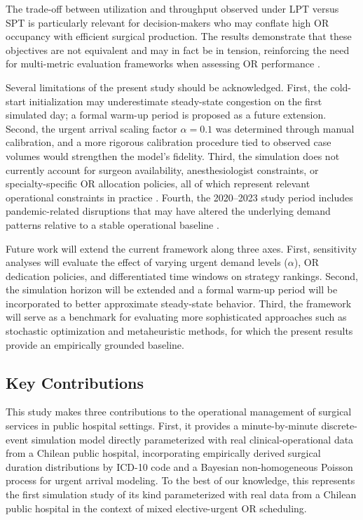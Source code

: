 \documentclass[sn-mathphys-num]{sn-jnl}
\begin{document}
The trade-off between utilization and throughput observed under LPT
versus SPT is particularly relevant for decision-makers who may
conflate high OR occupancy with efficient surgical production. The
results demonstrate that these objectives are not equivalent and may
in fact be in tension, reinforcing the need for multi-metric
evaluation frameworks when assessing OR performance \cite{schouten2023}.

Several limitations of the present study should be acknowledged.
First, the cold-start initialization may underestimate steady-state
congestion on the first simulated day; a formal warm-up period is
proposed as a future extension. Second, the urgent
arrival scaling factor $\alpha = 0.1$ was determined through manual
calibration, and a more rigorous calibration procedure tied to
observed case volumes would strengthen the model's fidelity. Third,
the simulation does not currently account for surgeon availability,
anesthesiologist constraints, or specialty-specific OR allocation
policies, all of which represent relevant operational constraints in
practice \cite{tsang2025}. Fourth, the 2020--2023 study period
includes pandemic-related disruptions that may have altered the
underlying demand patterns relative to a stable operational baseline \cite{campos2024examining}.

Future work will extend the current framework along three axes.
First, sensitivity analyses will evaluate the effect of varying
urgent demand levels ($\alpha$), OR dedication policies, and
differentiated time windows on strategy rankings. Second, the
simulation horizon will be extended and a formal warm-up period
will be incorporated to better approximate steady-state behavior.
Third, the framework will serve as a benchmark for evaluating more
sophisticated approaches such as stochastic optimization and
metaheuristic methods, for which the present results provide an
empirically grounded baseline.

\subsection{Key Contributions}

This study makes three contributions to the operational management
of surgical services in public hospital settings. First, it
provides a minute-by-minute discrete-event simulation model directly
parameterized with real clinical-operational data from a Chilean
public hospital, incorporating empirically derived surgical duration
distributions by ICD-10 code and a Bayesian non-homogeneous Poisson
process for urgent arrival modeling. To the best of our knowledge,
this represents the first simulation study of its kind parameterized
with real data from a Chilean public hospital in the context of
mixed elective-urgent OR scheduling.
\end{document}
